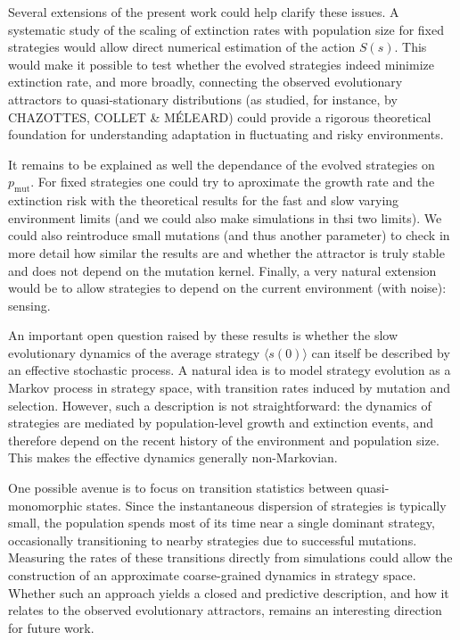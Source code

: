 \documentclass[a4paper,10pt,twocolumn]{article}
\begin{document}
Several extensions of the present work could help clarify these issues. A systematic study of the scaling of extinction rates with population size for fixed strategies would allow direct numerical estimation of the action $S(s)$. This would make it possible to test whether the evolved strategies indeed minimize extinction rate, and more broadly, connecting the observed evolutionary attractors to quasi-stationary distributions (as studied, for instance, by CHAZOTTES, COLLET \& MÉLEARD) could provide a rigorous theoretical foundation for understanding adaptation in fluctuating and risky environments.

It remains to be explained as well the dependance of the evolved strategies on $p_{\text{mut}}$. For fixed strategies one could try to aproximate the growth rate and the extinction risk with the theoretical results for the fast and slow varying environment limits (and we could also make simulations in thsi two limits). We could also reintroduce small mutations (and thus another parameter) to check in more detail how similar the results are and whether the attractor is truly stable and does not depend on the mutation kernel. Finally, a very natural extension would be to allow strategies to depend on the current environment (with noise): sensing.

An important open question raised by these results is whether the slow evolutionary dynamics of the average strategy $\langle s(0)\rangle$ can itself be described by an effective stochastic process. A natural idea is to model strategy evolution as a Markov process in strategy space, with transition rates induced by mutation and selection. However, such a description is not straightforward: the dynamics of strategies are mediated by population-level growth and extinction events, and therefore depend on the recent history of the environment and population size. This makes the effective dynamics generally non-Markovian.

One possible avenue is to focus on transition statistics between quasi-monomorphic states. Since the instantaneous dispersion of strategies is typically small, the population spends most of its time near a single dominant strategy, occasionally transitioning to nearby strategies due to successful mutations. Measuring the rates of these transitions directly from simulations could allow the construction of an approximate coarse-grained dynamics in strategy space. Whether such an approach yields a closed and predictive description, and how it relates to the observed evolutionary attractors, remains an interesting direction for future work.
\end{document}
